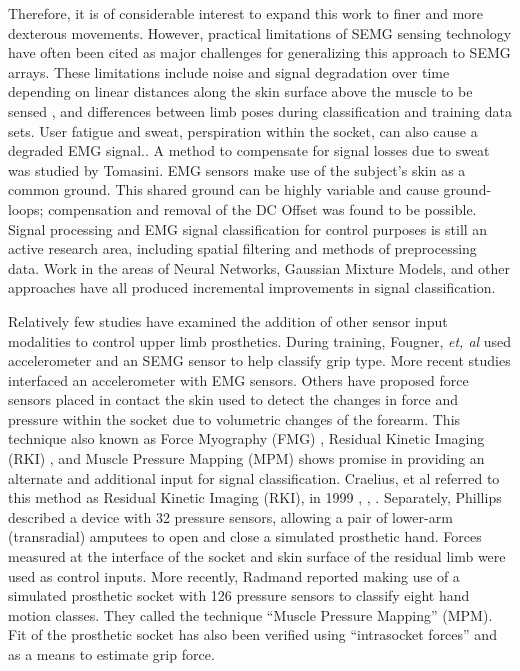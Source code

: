 \documentclass[twocolumn]{sagej}
\begin{document}
Therefore, it is of considerable interest to expand this work to finer and more dexterous movements. However, practical limitations of SEMG sensing technology have often been cited as major challenges for generalizing this approach to SEMG arrays. These limitations include noise and signal degradation over time depending on linear distances along the skin surface above the muscle to be sensed \cite{AsghariOskoei2007b, Hargrove2006b, Young2011}, and differences between limb poses during classification  and training  data sets\cite{Scheme2010a}.  User fatigue and sweat, perspiration within the socket, can also cause a degraded EMG signal.\cite{Ray1983, Abdoli-Eramaki2012, Dimitrova2003}.   A method to compensate for signal losses due to sweat was studied by Tomasini\cite{Tomasini2015}.  EMG sensors make use of the subject's skin as a common ground. This shared ground can be highly variable and cause ground-loops; compensation and removal of the DC Offset was found to be possible. Signal processing and EMG signal classification for control purposes is still an active research area, including spatial filtering\cite{Hahne2012} and methods of preprocessing data\cite{Hargrove2009}.  Work in the areas of Neural Networks\cite{Chan2000a, Mobasser2005}, Gaussian Mixture Models\cite{Chan2003a, Huang2005}, and other approaches have all produced incremental improvements in signal classification\cite{Derry:2014:EMP:2559636.2559685, Oskoei2006a, Oskoei2008b, Reaz02006}.  \par \noindent 
Relatively few studies have examined the addition of other sensor input modalities to control upper limb prosthetics.   During training, Fougner, \textit{et, al} used accelerometer and an SEMG sensor to help classify grip type\cite{Fougner2011}.  More recent studies interfaced an accelerometer with EMG sensors\cite{Assad2013, Wolf02013}.  Others have proposed force sensors placed in contact the skin used to detect the changes in force and pressure within the socket due to volumetric changes of the forearm.  This technique also known as Force Myography (FMG) \cite{Wininger02008}, Residual Kinetic Imaging (RKI) \cite{Phillips02005}, and Muscle Pressure Mapping (MPM) \cite{Radmand02014} shows promise in providing an alternate and additional input for signal classification. Craelius, et al referred to this method as Residual Kinetic Imaging (RKI), in 1999 \cite{Craelius01999}, \cite{Curcie02001}, \cite{Phillips02005}.  Separately, Phillips described a device with 32 pressure sensors, allowing a pair of lower-arm (transradial) amputees to open and close a simulated prosthetic hand.  Forces measured at the interface of the socket and skin surface of the residual limb were used as control inputs\cite{Phillips02005}.  More recently, Radmand reported making use of a simulated prosthetic socket with 126 pressure sensors to classify eight hand motion classes.  They called the technique ``Muscle Pressure Mapping'' (MPM)\cite{MEC02014}.  Fit of the prosthetic socket has also been verified using ``intrasocket forces'' \cite{Polliack02000} and as a means to estimate grip force\cite{Wininger02008}. \par \noindent
\end{document}
